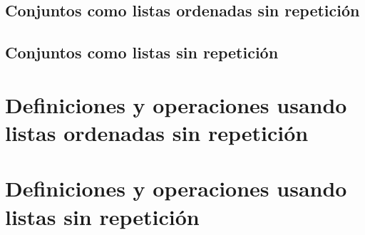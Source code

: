 \subsection{Conjuntos como listas ordenadas sin repetición}


\subsection{Conjuntos como listas sin repetición}


\section{Definiciones y operaciones usando listas ordenadas sin repetición}


\section{Definiciones y operaciones usando listas sin repetición}

